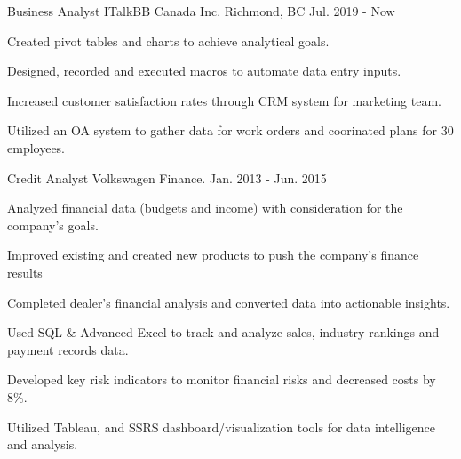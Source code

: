 \documentclass[11pt, a4paper]{awesome-cv}
\begin{document}
\begin{cventries}

\cventry
{Business Analyst} %
{ITalkBB Canada Inc.} %
{Richmond, BC} %
{Jul. 2019 - Now} %
{
  \begin{cvitems} %
    \item {Created pivot tables and charts to achieve analytical goals.}
    \item {Designed, recorded and executed macros to automate data entry inputs.}
    \item {Increased customer satisfaction rates through CRM system for marketing team.}
    \item {Utilized an OA system to gather data for work orders and coorinated plans for 30 employees.}
  \end{cvitems}
}

\cventry
{Credit Analyst} %
{Volkswagen Finance.} %
{} %
{Jan. 2013 - Jun. 2015} %
{
  \begin{cvitems} %
    \item {Analyzed financial data (budgets and income) with consideration for the company's goals.}
    \item {Improved existing and created new products to push the company's finance results}
    \item {Completed dealer's financial analysis and converted data into actionable insights.}
    \item {Used SQL \& Advanced Excel to track and analyze sales, industry rankings and payment records data.}
    \item {Developed key risk indicators to monitor financial risks and decreased costs by 8\%.}
    \item {Utilized Tableau, and SSRS dashboard/visualization tools for data intelligence and analysis.}
  \end{cvitems}
}


\end{cventries}
\end{document}
